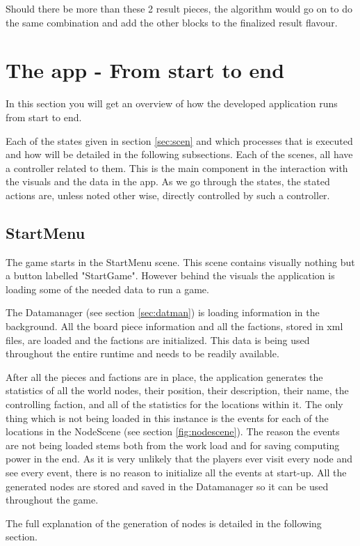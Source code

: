 Should there be more than these 2 result pieces, the algorithm would go on to do the same combination and add the other blocks to the finalized result flavour.

\section{The app - From start to end}
In this section you will get an overview of how the developed application runs from start to end. 

Each of the states given in section \ref{sec:scen} and which processes that is executed and how will be detailed in the following subsections.
Each of the scenes, all have a controller related to them. This is the main component in the interaction with the visuals and the data in the app. As we go through the states, the stated actions are, unless noted other wise, directly controlled by such a controller.

\subsection{StartMenu}
The game starts in the StartMenu scene. This scene contains visually nothing but a button labelled "StartGame". 
However behind the visuals the application is loading some of the needed data to run a game.

The Datamanager (see section \ref{sec:datman}) is loading information in the background. 
All the board piece information and all the factions, stored in xml files, are loaded and the factions are initialized. 
This data is being used throughout the entire runtime and needs to be readily available.

After all the pieces and factions are in place, the application generates the statistics of all the world nodes, their position, their description, their name, the controlling faction, and all of the statistics for the locations within it.
The only thing which is not being loaded in this instance is the events for each of the locations in the NodeScene (see section \ref{fig:nodescene}). The reason the events are not being loaded stems both from the work load and for saving computing power in the end. As it is very unlikely that the players ever visit every node and see every event, there is no reason to initialize all the events at start-up. 
All the generated nodes are stored and saved in the Datamanager so it can be used throughout the game.

The full explanation of the generation of nodes is detailed in the following section.

